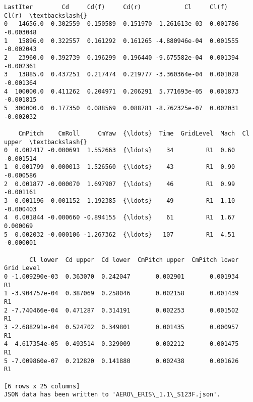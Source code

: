 \documentclass[11pt]{article}
\begin{document}
    \begin{Verbatim}[commandchars=\\\{\}]
   LastIter        Cd     Cd(f)     Cd(r)            Cl     Cl(f)     Cl(r)  \textbackslash{}
0   14656.0  0.302559  0.150589  0.151970 -1.261613e-03  0.001786 -0.003048
1   15896.0  0.322557  0.161292  0.161265 -4.880946e-04  0.001555 -0.002043
2   23960.0  0.392739  0.196299  0.196440 -9.675582e-04  0.001394 -0.002361
3   13885.0  0.437251  0.217474  0.219777 -3.360364e-04  0.001028 -0.001364
4  100000.0  0.411262  0.204971  0.206291  5.771693e-05  0.001873 -0.001815
5  300000.0  0.177350  0.088569  0.088781 -8.762325e-07  0.002031 -0.002032

    CmPitch    CmRoll     CmYaw  {\ldots}  Time  GridLevel  Mach  Cl upper  \textbackslash{}
0  0.002417 -0.000691  1.552663  {\ldots}    34         R1  0.60 -0.001514
1  0.001799  0.000013  1.526560  {\ldots}    43         R1  0.90 -0.000586
2  0.001877 -0.000070  1.697907  {\ldots}    46         R1  0.99 -0.001161
3  0.001196 -0.001152  1.192385  {\ldots}    49         R1  1.10 -0.000403
4  0.001844 -0.000660 -0.894155  {\ldots}    61         R1  1.67  0.000069
5  0.002032 -0.000106 -1.267362  {\ldots}   107         R1  4.51 -0.000001

       Cl lower  Cd upper  Cd lower  CmPitch upper  CmPitch lower  Grid Level
0 -1.009290e-03  0.363070  0.242047       0.002901       0.001934          R1
1 -3.904757e-04  0.387069  0.258046       0.002158       0.001439          R1
2 -7.740466e-04  0.471287  0.314191       0.002253       0.001502          R1
3 -2.688291e-04  0.524702  0.349801       0.001435       0.000957          R1
4  4.617354e-05  0.493514  0.329009       0.002212       0.001475          R1
5 -7.009860e-07  0.212820  0.141880       0.002438       0.001626          R1

[6 rows x 25 columns]
JSON data has been written to 'AERO\_ERIS\_1.1\_S123F.json'.
    \end{Verbatim}
\end{document}
